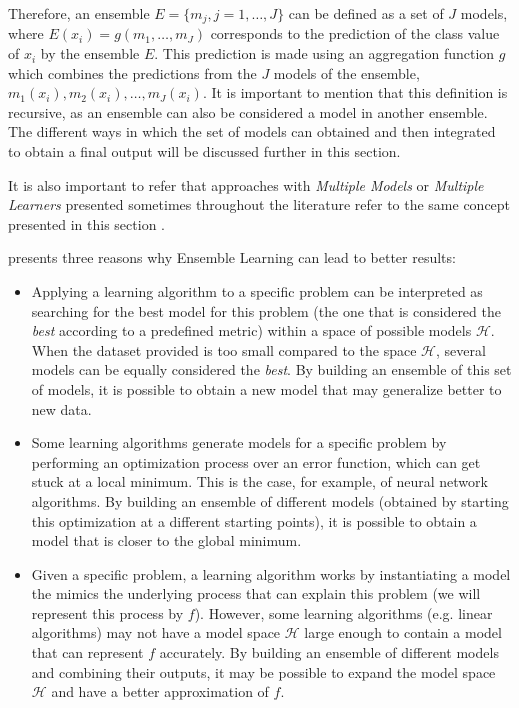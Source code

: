 Therefore, an ensemble $E = \{m_j, j = 1, \dots, J \}$ can be defined as a set of $J$ models, where $E(x_i) = g(m_1, \dots, m_J)$ corresponds to the prediction of the class value of $x_i$ by the ensemble $E$. This prediction is made using an aggregation function $g$ which combines the predictions from the $J$ models of the ensemble, $m_1(x_i), m_2(x_i), \ldots, m_J(x_i)$.
It is important to mention that this definition is recursive, as an ensemble can also be considered a model in another ensemble.
The different ways in which the set of models can obtained and then integrated to obtain a final output will be discussed further in this section.


It is also important to refer that approaches with \textit{Multiple Models} or \textit{Multiple Learners} presented sometimes throughout the literature refer to the same concept presented in this section \cite{Mendes-Moreira2012}.

\textcite{Dietterich1990} presents three reasons why Ensemble Learning can lead to better results:

\begin{itemize}
	\item Applying a learning algorithm to a specific problem can be interpreted as searching for the best model for this problem (the one that is considered the \textit{best} according to a predefined metric) within a space of possible models $\mathcal{H}$. When the dataset provided is too small compared to the space $\mathcal{H}$, several models can be equally considered the \textit{best}. By building an ensemble of this set of models, it is possible to obtain a new model that may generalize better to new data.
	
	\item Some learning algorithms generate models for a specific problem by performing an optimization process over an error function, which can get stuck at a local minimum. This is the case, for example, of neural network algorithms. By building an ensemble of different models (obtained by starting this optimization at a different starting points), it is possible to obtain a model that is closer to the global minimum.
	
	\item Given a specific problem, a learning algorithm works by instantiating a model the mimics the underlying process that can explain this problem (we will represent this process by $f$). However, some learning algorithms (e.g. linear algorithms) may not have a model space $\mathcal{H}$ large enough to contain a model that can represent $f$ accurately. By building an ensemble of different models and combining their outputs, it may be possible to expand the model space $\mathcal{H}$ and have a better approximation of $f$.
\end{itemize}

